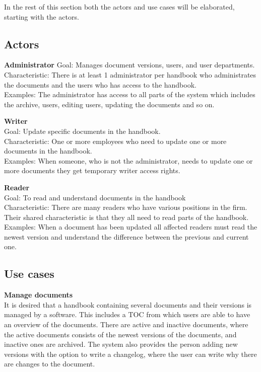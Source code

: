 In the rest of this section both the actors and use cases will be elaborated, starting with the actors.

\subsection{Actors}\label{sec:Actors}

\textbf{Administrator}
Goal: Manages document versions, users, and user departments.
\\
Characteristic: There is at least 1 administrator per handbook who administrates the documents and the users who has access to the handbook.
\\
Examples: The administrator has access to all parts of the system which includes the archive, users, editing users, updating the documents and so on.

\textbf{Writer}
\\
Goal: Update specific documents in the handbook.
\\
Characteristic: One or more employees who need to update one or more documents in the handbook.
\\
Examples: When someone, who is not the administrator, needs to update one or more documents they get temporary writer access rights.

\textbf{Reader}
\\
Goal: To read and understand documents in the handbook
\\
Characteristic: There are many readers who have various positions in the firm. Their shared characteristic is that they all need to read parts of the handbook.
\\
Examples: When a document has been updated all affected readers must read the newest version and understand the difference between the previous and current one.

\subsection{Use cases} \label{sec:usecases}
\textbf{Manage documents}
\\
It is desired that a handbook containing several documents and their versions is managed by a software.
This includes a TOC from which users are able to have an overview of the documents.
There are active and inactive documents, where the active documents consists of the newest versions of the documents, and inactive ones are archived.
The system also provides the person adding new versions with the option to write a changelog, where the user can write why there are changes to the document.

